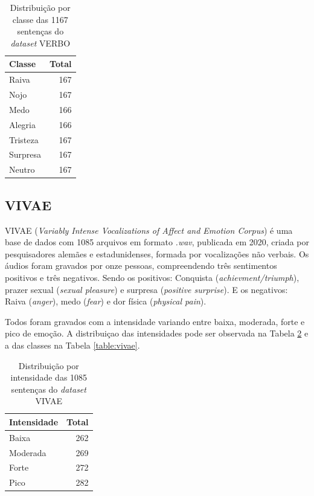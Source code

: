 \begin{table}[!ht]
\centering
\caption{Distribuição por classe das 1167 sentenças do \textit{dataset} VERBO}
    \begin{tabular}{|l|r|}
    \hline
        Classe & Total \\ \hline
        Raiva & 167  \\ \hline
        Nojo & 167  \\ \hline
        Medo & 166  \\ \hline
        Alegria & 166  \\ \hline
        Tristeza & 167  \\ \hline
        Surpresa & 167  \\ \hline
        Neutro & 167  \\ \hline
    \end{tabular}\label{table:verbo}
\end{table}

\subsection{VIVAE}\label{subsection:vivae}

VIVAE \cite{16} (\textit{Variably Intense Vocalizations of Affect and Emotion Corpus}) é uma base de dados com 1085 arquivos em formato \textit{.wav}, publicada em 2020, criada por pesquisadores alemães e estadunidenses, formada por vocalizações não verbais. Os áudios foram gravados por onze pessoas, compreendendo três sentimentos positivos e três negativos. Sendo os positivos: Conquista (\textit{achievment/triumph}), prazer sexual (\textit{sexual pleasure}) e surpresa (\textit{positive surprise}). E os negativos: Raiva (\textit{anger}), medo (\textit{fear}) e dor física (\textit{physical pain}).

Todos foram gravados com a intensidade variando entre baixa, moderada, forte e pico de emoção. A distribuiçao das intensidades pode ser observada na Tabela \ref{table:vivaeintensidade} e a das classes na Tabela \ref{table:vivae}.

\begin{table}[!ht]
    \centering
    \caption{Distribuição por intensidade das 1085 sentenças do \textit{dataset} VIVAE}
    \begin{tabular}{|l|r|}
    \hline
        Intensidade & Total  \\ \hline
        Baixa & 262  \\ \hline
        Moderada & 269  \\ \hline
        Forte & 272  \\ \hline
        Pico & 282  \\ \hline
    \end{tabular}\label{table:vivaeintensidade}
\end{table}

